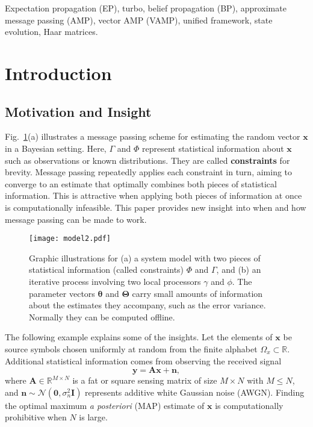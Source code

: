 \documentclass[journal]{IEEEtran}
\newcommand{\BE}{\begin{equation}}
\newcommand{\EE}{\end{equation}}
\renewcommand{\bf}{\bm}
\renewcommand{\cal}{\mathcal}
\begin{document}
\begin{IEEEkeywords}
Expectation propagation (EP), turbo, belief propagation (BP), approximate message passing (AMP), vector AMP (VAMP), unified framework, state evolution, Haar  matrices.
\end{IEEEkeywords}

\IEEEpeerreviewmaketitle
\vspace{0.5cm}

\newcommand{\bx}{\bf{x}}
\newcommand{\bX}{\bf{\mathcal{X}}}
\newcommand{\hx}{\hat{\bf{x}}}
\newcommand{\hX}{\hat{\bf{\mathcal{X}}}}
\newcommand{\bV}{\bf{V}}


\section{Introduction}

\subsection{Motivation and Insight}
Fig.~\ref{Fig:model}(a) illustrates a message passing scheme for estimating the random vector $\bf{x}$ in a Bayesian setting. Here, $\Gamma$ and $\Phi$ represent statistical information about $\bf{x}$ such as observations or known distributions. They are called \textbf{constraints} for brevity. Message passing repeatedly applies each constraint in turn, aiming to converge to an estimate that optimally combines both pieces of statistical information. This is attractive when applying both pieces of information at once is computationally infeasible. This paper provides new insight into when and how message passing can be made to work.

\begin{figure}[htb]
  \centering 
  \texttt{[image: model2.pdf]}\\ 
  \caption{Graphic illustrations for (a) a system model with two pieces of statistical information (called constraints) $\Phi$ and $\Gamma$, and (b) an iterative process involving two local processors $\gamma$ and $\phi$. The parameter vectors $\bf{\theta}$ and $\bf{\Theta}$ carry small amounts of information about the estimates they accompany, such as the error variance. Normally they can be computed offline.
  }
  \label{Fig:model}
\end{figure}

The following example explains some of the insights. Let the elements of $\bf{x}$ be source symbols chosen uniformly at random from the finite alphabet $\Omega_x \subset \mathbb{R}$. Additional statistical information comes from observing the received signal
\BE\label{Eqn:linear_system}
\bf{y}=\bf{A}\bf{x} + \bf{n},
\EE					
where $\bf{A} \in \mathbb{R}^{M \times N}$ is a fat or square sensing matrix of size $M \times N$ with $M\le N$, and $\bf{n}\sim\cal{N}(\bf{0},\sigma_n^2\bf{I})$ represents additive white Gaussian noise (AWGN). Finding the optimal maximum \textit{a posteriori} (MAP) estimate of $\bf{x}$ is computationally prohibitive when $N$ is large.
\end{document}
